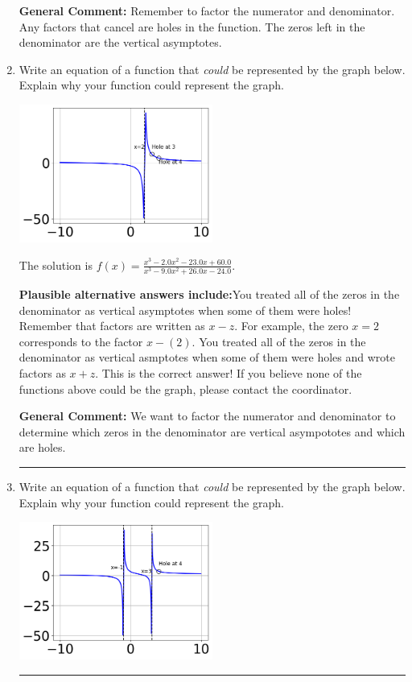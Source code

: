 \documentclass{extbook}[14pt]
\newcommand{\litem}[1]{\item #1

\rule{\textwidth}{0.4pt}}
\begin{document}
\begin{enumerate}
{\textbf{General Comment:} Remember to factor the numerator and denominator. Any factors that cancel are holes in the function. The zeros left in the denominator are the vertical asymptotes.
}
\litem{
Write an equation of a function that \textit{could} be represented by the graph below. Explain why your function could represent the graph.

\begin{center}
    \includegraphics[width=0.5\textwidth]{../Figures/identifyGraphOfRationalFunctionA.png}
\end{center}


The solution is \( f(x)=\frac{x^{3} -2.0 x^{2} -23.0 x + 60.0}{x^{3} -9.0 x^{2} +26.0 x -24.0} \).\begin{enumerate}[label=\Alph*.]
\textbf{Plausible alternative answers include:}You treated all of the zeros in the denominator as vertical asymptotes when some of them were holes!
Remember that factors are written as $x-z$. For example, the zero $x=2$ corresponds to the factor $x-(2)$.
You treated all of the zeros in the denominator as vertical asmptotes when some of them were holes and wrote factors as $x+z$.
This is the correct answer!
If you believe none of the functions above could be the graph, please contact the coordinator.
\end{enumerate}

\textbf{General Comment:} We want to factor the numerator and denominator to determine which zeros in the denominator are vertical asympototes and which are holes.
}
\litem{
Write an equation of a function that \textit{could} be represented by the graph below. Explain why your function could represent the graph.

\begin{center}
    \includegraphics[width=0.5\textwidth]{../Figures/identifyGraphOfRationalFunctionCopyA.png}
\end{center}


}
\end{enumerate}
\end{document}
